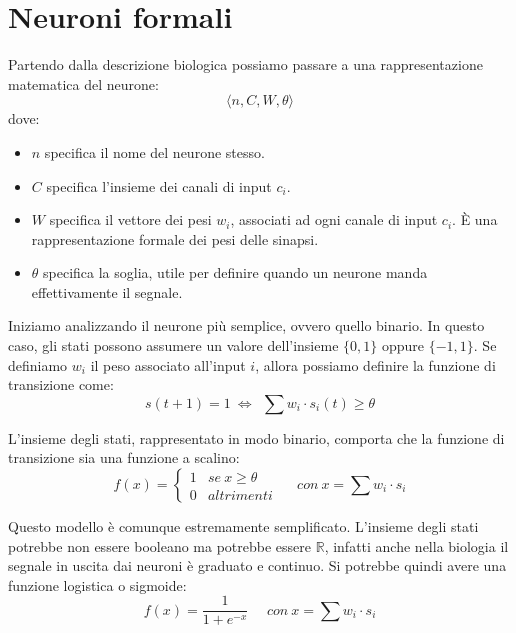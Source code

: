 \section{Neuroni formali}
Partendo dalla descrizione biologica possiamo passare a una rappresentazione
matematica del neurone:
\begin{equation}
    \langle n, C, W, \theta \rangle
\end{equation}
dove:
\begin{itemize}
    \item $n$ specifica il nome del neurone stesso.
    \item $C$ specifica l'insieme dei canali di input $c_i$.
    \item $W$ specifica il vettore dei pesi $w_i$, associati ad ogni canale di
          input $c_i$. È una rappresentazione formale dei pesi delle sinapsi.
    \item $\theta$ specifica la soglia, utile per definire quando un neurone manda
          effettivamente il segnale.
\end{itemize}

Iniziamo analizzando il neurone più semplice, ovvero quello binario. In questo
caso, gli stati possono assumere un valore dell'insieme $\{0, 1\}$ oppure $\{-1, 1\}$.
Se definiamo $w_i$ il peso associato all'input $i$, allora possiamo definire la
funzione di transizione come:
\begin{equation}
    s(t + 1) = 1 \ \iff \ \ \sum w_i \cdot s_i(t) \geq \theta
\end{equation}

L’insieme degli stati, rappresentato in modo binario, comporta che la funzione di
transizione sia una funzione a scalino:
\begin{equation}
    f(x) = \begin{cases}
        1 & se \ x \geq \theta \\
        0 & altrimenti
    \end{cases} \ \ \ \ \ \ con \ x = \sum w_i \cdot s_i
\end{equation}

Questo modello è comunque estremamente semplificato. L'insieme degli stati potrebbe
non essere booleano ma potrebbe essere $\mathbb{R}$, infatti anche nella biologia
il segnale in uscita dai neuroni è graduato e continuo. Si potrebbe quindi avere
una funzione logistica o sigmoide:
\begin{equation}
    f(x) = \frac{1}{1 + e^{-x}} \ \ \ \ \ \ con \ x = \sum w_i \cdot s_i
\end{equation}
